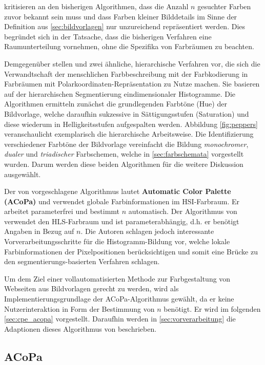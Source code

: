 \citet{acopa} kritisieren an den bisherigen Algorithmen, dass die Anzahl $n$ gesuchter Farben zuvor bekannt sein muss und dass Farben kleiner Bilddetails im Sinne der Definition aus \ref{sec:bildvorlagen} nur unzureichend repräsentiert werden. Dies begründet sich in der Tatsache, dass die bisherigen Verfahren eine Raumunterteilung vornehmen, ohne die Spezifika von Farbräumen zu beachten.

Demgegenüber stellen \citet{acopa} und \citet{image-based-schemes} zwei ähnliche, hierarchische Verfahren vor, die sich die Verwandtschaft der menschlichen Farbbeschreibung mit der Farbkodierung in Farbräumen mit Polarkoordinaten-Repräsentation zu Nutze machen. Sie basieren auf der hierarchischen Segmentierung eindimensionaler Histogramme. Die Algorithmen ermitteln zunächst die grundlegenden Farbtöne (Hue) der Bildvorlage, welche daraufhin sukzessive in Sättigungsstufen (Saturation) und diese wiederum in Helligkeitsstufen aufgespalten werden. Abbildung \ref{fig:peppers} veranschaulicht exemplarisch die hierarchische Arbeitsweise. Die Identifizierung verschiedener Farbtöne der Bildvorlage vereinfacht die Bildung \emph{monochromer}, \emph{dualer} und \emph{triadischer} Farbschemen, welche in \autoref{sec:farbschemata} vorgestellt wurden. Darum werden diese beiden Algorithmen für die weitere Diskussion ausgewählt.

Der von \citet{acopa} vorgeschlagene Algorithmus lautet  \textbf{Automatic Color Palette (ACoPa)} und verwendet globale Farbinformationen im HSI-Farbraum. Er arbeitet parameterfrei und bestimmt $n$ automatisch. Der Algorithmus von \citet{image-based-schemes} verwendet den HLS-Farbraum und ist parameterabhängig, d.h. er benötigt Angaben in Bezug auf $n$. Die Autoren schlagen jedoch interessante Vorverarbeitungsschritte für die Histogramm-Bildung vor, welche lokale Farbinformationen der Pixelpositionen berücksichtigen und somit eine Brücke zu den segmentierungs-basierten Verfahren schlagen.

Um dem Ziel einer vollautomatisierten Methode zur Farbgestaltung von Webseiten aus Bildvorlagen gerecht zu werden, wird als Implementierungsgrundlage der ACoPa-Algorithmus gewählt, da er keine Nutzerinteraktion in Form der Bestimmung von $n$ benötigt. Er wird im folgenden \autoref{sec:cpe_acopa} vorgestellt. Daraufhin werden in \autoref{sec:vorverarbeitung} die Adaptionen dieses Algorithmus von \citet{image-based-schemes} beschrieben.



\subsection{ACoPa}
\label{sec:cpe_acopa}

